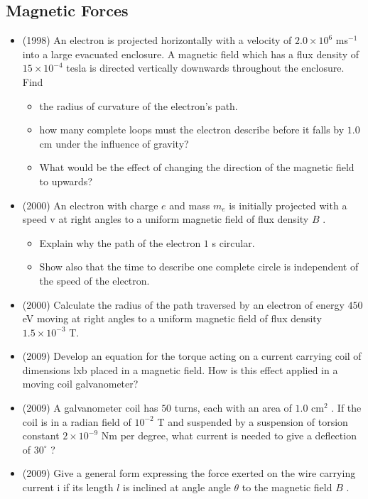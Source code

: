 \documentclass{article}
\begin{document}
\subsection{Magnetic Forces}
\begin{itemize}
\item (1998)  An electron is projected horizontally with a velocity of $ 2.0 \times 10^{6}$ ms$ ^{-1}$ into a large evacuated enclosure. A magnetic field which has a flux density of $ 15 \times 10^{-4}$ tesla is directed vertically downwards throughout the enclosure. Find\begin{itemize}
\item the radius of curvature of the electron's path.
\item how many complete loops must the electron describe before it falls by $ 1.0$ cm under the influence of gravity?
\item What would be the effect of changing the direction of the magnetic field to upwards?
\end{itemize}
\item (2000)  An electron with charge $ e$ and mass $ m_{e}$ is initially projected with a speed v at right angles to a uniform magnetic field of flux density $ B$ .\begin{itemize}
\item Explain why the path of the electron $ 1$ s circular.
\item Show also that the time to describe one complete circle is independent of the speed of the electron.
\end{itemize}
\item (2000)  Calculate the radius of the path traversed by an electron of energy $ 450$ eV moving at right angles to a uniform magnetic field of flux density $ 1.5\times 10^{-3}$ T.
\item (2009)  Develop an equation for the torque acting on a current carrying coil of dimensions lxb placed in a magnetic field.  How is this effect applied in a moving coil galvanometer?
\item (2009)  A galvanometer coil has $ 50$ turns, each with an area of $ 1.0 $ cm$ ^{2}$ .  If the coil is in a radian field of $ 10^{-2}$ T and suspended by a suspension of torsion constant $ 2 \times 10^{-9}$ Nm per degree, what current is needed to give a deflection of $ 30^{\circ}$ ?
\item (2009)  Give a general form expressing the force exerted on the wire carrying current i if its length $ l$ is inclined at angle angle $ \theta $ to the magnetic field $ B$ .  

\end{itemize}
\end{document}
